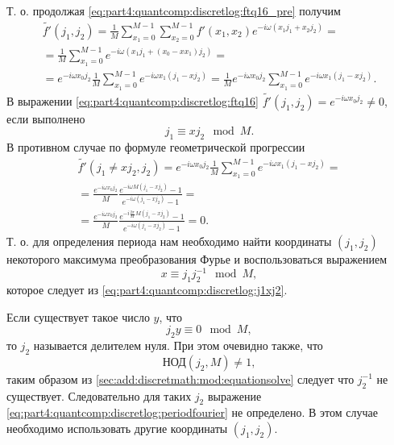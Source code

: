 Т. о. продолжая \eqref{eq:part4:quantcomp:discretlog:ftq16_pre} получим
\begin{eqnarray}
\tilde{f'}\left(j_1, j_2\right) = 
\frac{1}{M}\sum_{x_1 = 0}^{M-1}\sum_{x_2 = 0}^{M-1} 
f'\left(x_1, x_2\right)e^{-i \omega\left(x_1 j_1 + x_2j_2\right)} =
\nonumber \\
=
 \frac{1}{M}\sum_{x_1 = 0}^{M-1}
e^{-i \omega\left(x_1 j_1 + (x_0 - x
   x_1) j_2\right)} = 
\nonumber \\
= e^{-i \omega x_0 j_2}\frac{1}{M}\sum_{x_1 = 0}^{M-1}
e^{-i  \omega x_1 \left(j_1 - x j_2\right)} =
\frac{1}{M} e^{-i \omega x_0 j_2} 
\sum_{x_1 = 0}^{M-1} e^{-i  \omega x_1 \left(j_1 - x j_2\right)}.
\label{eq:part4:quantcomp:discretlog:ftq16}
\end{eqnarray}
В выражении
\eqref{eq:part4:quantcomp:discretlog:ftq16} $\tilde{f'}(j_1, j_2) =
e^{-i \omega x_0 j_2} \ne 0$, если выполнено 
\begin{equation}
j_1 \equiv x j_2 \mod M.
\label{eq:part4:quantcomp:discretlog:j1xj2}
\end{equation} 
В противном случае по формуле геометрической прогрессии 
\begin{eqnarray}
\tilde{f'}\left(j_1 \ne x j_2, j_2\right) = 
e^{-i \omega x_0 j_2}\frac{1}{M}
\sum_{x_1 = 0}^{M-1}e^{-i
  \omega x_1 \left(j_1 - x j_2\right)} = 
\nonumber \\
=
\frac{e^{-i \omega x_0 j_2}}{M} \frac{e^{-i
  \omega M \left(j_1 - x j_2\right)} - 1}{e^{-i
  \omega \left(j_1 - x j_2\right)} - 1} = 
\nonumber \\
=
 \frac{e^{-i \omega x_0 j_2}}{M} 
\frac{e^{-i \frac{2 \pi}{M} M \left(j_1 - x j_2\right)} - 1}{e^{-i
  \omega \left(j_1 - x j_2\right)} - 1} = 0.
\nonumber
\end{eqnarray} 
Т. о. для определения периода нам необходимо найти координаты $(j_1, j_2)$
некоторого максимума преобразования Фурье и воспользоваться выражением 
\begin{equation}
x \equiv j_1 j_2^{-1} \mod M,
\label{eq:part4:quantcomp:discretlog:periodfourier}
\end{equation}
которое следует из \eqref{eq:part4:quantcomp:discretlog:j1xj2}.

\begin{remark}
Если существует такое число $y$, что 
\[
j_2 y \equiv 0 \mod M,
\]
то $j_2$ называется делителем нуля. 
При этом очевидно также, что 
\[
\mbox{НОД}\left(j_2, M\right) \ne 1,
\]
таким образом из \autoref{sec:add:discretmath:mod:equationsolve}
следует что $j_2^{-1}$ не существует. Следовательно для таких
$j_2$ выражение
\eqref{eq:part4:quantcomp:discretlog:periodfourier} не определено. В
этом случае необходимо использовать другие координаты $(j_1, j_2)$. 
\end{remark}

